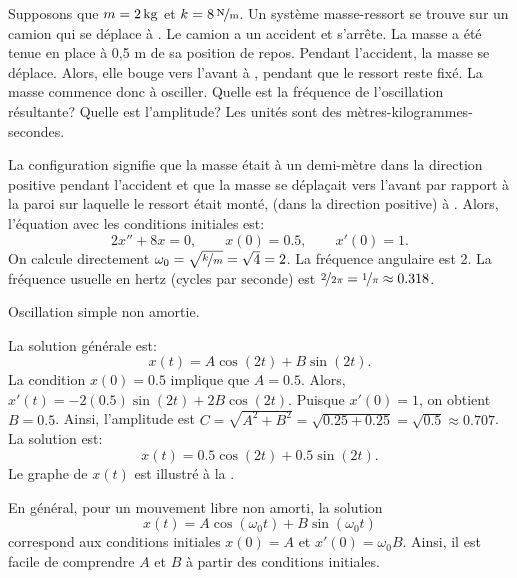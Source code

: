 \begin{example}
	Supposons que $m=\unit[2]{kg}$ et $k=\unitfrac[8]{N}{m}$.  
	Un système masse-ressort se trouve sur un camion qui se déplace à  .
	Le camion a un accident et s'arrête.  
	La masse a été tenue en place à 0{,}5 m de sa position de repos. Pendant l'accident, la masse se déplace. 
	Alors, elle bouge vers l'avant à , pendant que le ressort reste fixé.   
	La masse commence donc à osciller. Quelle est la fréquence de l'oscillation résultante? 
	Quelle est l'amplitude? Les unités sont des  mètres-kilogrammes-secondes.
	
	La configuration signifie que la masse était à un demi-mètre dans la 
	direction positive pendant l'accident et que la masse se déplaçait vers l'avant 
	par rapport à la paroi sur laquelle le ressort était monté,
	(dans la direction positive) à .  
	Alors, l'équation avec les conditions initiales est: 
	\begin{equation*}
		2 x'' + 8 x = 0 , \qquad x(0) = 0.5, \qquad x'(0) = 1.
	\end{equation*}
	On calcule directement $\omega_0 = \sqrt{\nicefrac{k}{m}} = \sqrt{4} = 2$.
	La fréquence angulaire est 2.  La fréquence usuelle en hertz (cycles par
	seconde) est $\nicefrac{2}{2\pi} = \nicefrac{1}{\pi} \approx 0.318$.
	
	\begin{mywrapfig}[15]{3.25in}
	\capstart {}
	\caption{Oscillation simple non amortie.\label{mv:undampedfig}}
	\end{mywrapfig}
	
	La solution générale est: 
	\begin{equation*}
		x(t) = A \cos (2t) + B \sin (2t) .
	\end{equation*}
	La condition $x(0) = 0.5$ implique que $A = 0.5$.  
	Alors, $x'(t) = - 2(0.5) \sin (2t) + 2B \cos (2t)$.
	Puisque $x'(0) = 1$, on obtient $B = 0.5$.  Ainsi, l'amplitude est
	$C = \sqrt{A^2+B^2} = \sqrt{0.25+0.25} = \sqrt{0.5} \approx 0.707$. 
	La solution est: 
	\begin{equation*}
		x(t) = 0.5 \cos (2t) + 0.5 \sin (2t) .
	\end{equation*}
	Le graphe de  $x(t)$ est illustré à la  .
\end{example}

En général, pour un mouvement libre non amorti, la solution
\begin{equation*}
	x(t) = A \cos (\omega_0 t) + B \sin (\omega_0 t) 
\end{equation*}
correspond aux conditions initiales $x(0) = A$ et $x'(0) = \omega_0 B$.
Ainsi, il est facile de comprendre $A$ et $B$ à partir des conditions initiales. 

